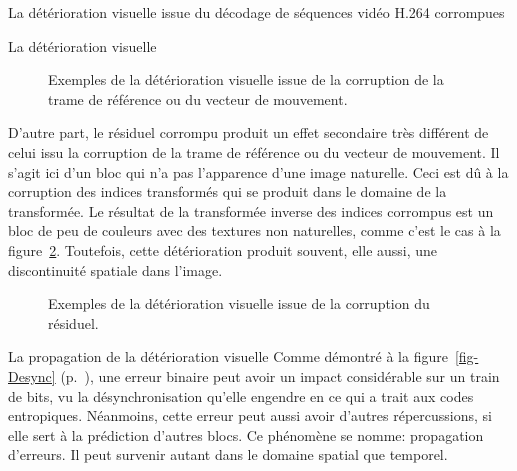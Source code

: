 \documentclass[letterpaper, twoside, 12pt,memoire]{thETS}
\newcommand{\fig}[1]{figure~\ref{#1}}
\newcommand{\page}[1]{(p.~\pageref{#1})}
\begin{document}
\begin{chapter}{La détérioration visuelle issue du décodage de séquences vidéo
H.264 corrompues}
\begin{section}{La détérioration visuelle}
\begin{figure}[htb]
{\begin{varwidth}{\textwidth}
\end{varwidth}}
\caption{Exemples de la détérioration visuelle issue de la corruption de la
trame de référence ou du vecteur de mouvement.}
\label{fig-VectorsBad}
\end{figure}

D'autre part, le résiduel corrompu produit un effet secondaire très différent de
celui issu la corruption de la trame de référence ou du vecteur de mouvement.
Il s'agit ici d'un bloc qui n'a pas l'apparence d'une image naturelle. Ceci est
dû à la corruption des indices transformés qui se produit dans le domaine de la
transformée. Le résultat de la transformée inverse des indices corrompus est un
bloc de peu de couleurs avec des textures non naturelles, comme c'est le cas à
la \fig{fig-ResBad}. Toutefois, cette détérioration produit souvent, elle aussi,
une discontinuité spatiale dans l'image.

\begin{figure}[htb]
\caption{Exemples de la détérioration visuelle issue de la corruption du
résiduel.}
\label{fig-ResBad}
\end{figure}

\end{section}

\begin{section}{La propagation de la détérioration visuelle}
\label{sect-propagation}
Comme démontré à la \fig{fig-Desync} \page{fig-Desync}, une erreur
binaire peut avoir un impact considérable sur un train de bits, vu la
désynchronisation qu'elle engendre en ce qui a trait aux codes entropiques.
Néanmoins, cette erreur peut aussi avoir d'autres répercussions, si elle sert à
la prédiction d'autres blocs. Ce phénomène se nomme: propagation d'erreurs. Il
peut survenir autant dans le domaine spatial que temporel.


\end{section}
\end{chapter}
\end{document}
